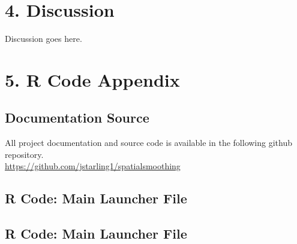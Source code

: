 \documentclass[11pt]{article}
\newcommand{\myindent}{\hspace*{1cm}}
\begin{document}
\newpage
\section{4. Discussion}

Discussion goes here. \\


\newpage
\section{5. R Code Appendix}

\subsection{Documentation Source}
All project documentation and source code is available in the following github repository. \\

\myindent \underline{https://github.com/jstarling1/spatialsmoothing}

\subsection{R Code: Main Launcher File}


\subsection{R Code: Main Launcher File}


% 
% 
% 
% 
% 
\end{document}
